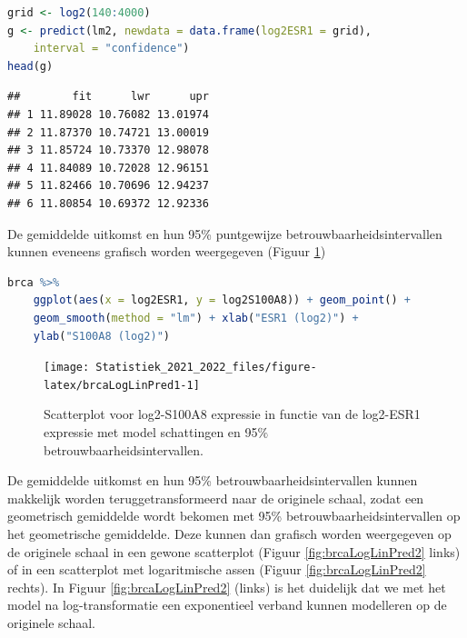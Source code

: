 \documentclass[
  12pt,dutch,coursenotes]{book}
\theoremstyle{definition}
\theoremstyle{definition}
\theoremstyle{definition}
\theoremstyle{definition}
\theoremstyle{remark}
\begin{document}
\begin{lstlisting}[language=R]
grid <- log2(140:4000)
g <- predict(lm2, newdata = data.frame(log2ESR1 = grid),
    interval = "confidence")
head(g)
\end{lstlisting}

\begin{lstlisting}
##        fit      lwr      upr
## 1 11.89028 10.76082 13.01974
## 2 11.87370 10.74721 13.00019
## 3 11.85724 10.73370 12.98078
## 4 11.84089 10.72028 12.96151
## 5 11.82466 10.70696 12.94237
## 6 11.80854 10.69372 12.92336
\end{lstlisting}

De gemiddelde uitkomst en hun 95\% puntgewijze betrouwbaarheidsintervallen kunnen eveneens grafisch worden weergegeven (Figuur \ref{fig:brcaLogLinPred1})

\begin{lstlisting}[language=R]
brca %>%
    ggplot(aes(x = log2ESR1, y = log2S100A8)) + geom_point() +
    geom_smooth(method = "lm") + xlab("ESR1 (log2)") +
    ylab("S100A8 (log2)")
\end{lstlisting}

\begin{figure}

{\centering \texttt{[image: Statistiek\_2021\_2022\_files/figure-latex/brcaLogLinPred1-1]} 

}

\caption{Scatterplot voor log2-S100A8 expressie in functie van de log2-ESR1 expressie met model schattingen en 95$\%$ betrouwbaarheidsintervallen.}\label{fig:brcaLogLinPred1}
\end{figure}

De gemiddelde uitkomst en hun 95\% betrouwbaarheidsintervallen kunnen makkelijk worden teruggetransformeerd naar de originele schaal, zodat een geometrisch gemiddelde wordt bekomen met 95\% betrouwbaarheidsintervallen op het geometrische gemiddelde.
Deze kunnen dan grafisch worden weergegeven op de originele schaal in een gewone scatterplot (Figuur \ref{fig:brcaLogLinPred2} links) of in een scatterplot met logaritmische assen (Figuur \ref{fig:brcaLogLinPred2} rechts).
In Figuur \ref{fig:brcaLogLinPred2} (links) is het duidelijk dat we met het model na log-transformatie een exponentieel verband kunnen modelleren op de originele schaal.
\end{document}
